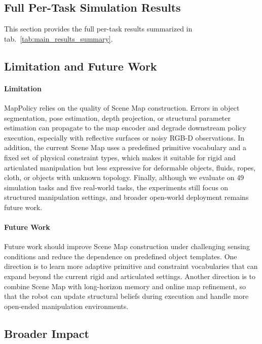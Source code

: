 \subsection{Full Per-Task Simulation Results}
\label{app:full_sim_results}

This section provides the full per-task results summarized in tab.~\ref{tab:main_results_summary}.





\subsection{Limitation and Future Work}
\label{app:limitations}

\paragraph{Limitation}
MapPolicy relies on the quality of Scene Map construction. Errors in object segmentation, pose estimation, depth projection, or structural parameter estimation can propagate to the map encoder and degrade downstream policy execution, especially with reflective surfaces or noisy RGB-D observations. In addition, the current Scene Map uses a predefined primitive vocabulary and a fixed set of physical constraint types, which makes it suitable for rigid and articulated manipulation but less expressive for deformable objects, fluids, ropes, cloth, or objects with unknown topology. Finally, although we evaluate on 49 simulation tasks and five real-world tasks, the experiments still focus on structured manipulation settings, and broader open-world deployment remains future work.

\paragraph{Future Work}
Future work should improve Scene Map construction under challenging sensing conditions and reduce the dependence on predefined object templates. One direction is to learn more adaptive primitive and constraint vocabularies that can expand beyond the current rigid and articulated settings. Another direction is to combine Scene Map with long-horizon memory and online map refinement, so that the robot can update structural beliefs during execution and handle more open-ended manipulation environments.

\subsection{Broader Impact}
\label{app:broader_impact}

